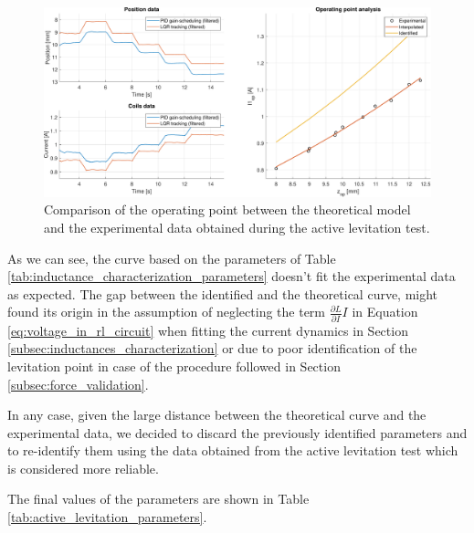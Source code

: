 \begin{figure}[H]
    \centering
    \includegraphics[width=1\textwidth]{img/MATLAB/identification/operating_point_analysis.pdf}
    \caption{Comparison of the operating point between the theoretical model and the experimental data obtained during the active levitation test.}
    \label{fig:active_levitation}
\end{figure}

As we can see, the curve based on the parameters of Table \ref{tab:inductance_characterization_parameters} doesn't fit the experimental data as expected.
The gap between the identified and the theoretical curve, might found its origin in the assumption of neglecting the term $\frac{\partial L}{\partial I} I$ in Equation \ref{eq:voltage_in_rl_circuit} when fitting the current dynamics in Section \ref{subsec:inductances_characterization} or due to poor identification of the levitation point in case of the procedure followed in Section \ref{subsec:force_validation}.

In any case, given the large distance between the theoretical curve and the experimental data, we decided to discard the previously identified parameters and to re-identify them using the data obtained from the active levitation test which is considered more reliable.

The final values of the parameters are shown in Table \ref{tab:active_levitation_parameters}.

